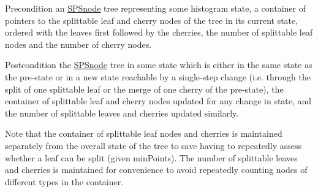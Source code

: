 \begin{DoxyPrecond}{\-Precondition}
an \hyperlink{classsubpavings_1_1SPSnode}{\-S\-P\-Snode} tree representing some histogram state, a container of pointers to the splittable leaf and cherry nodes of the tree in its current state, ordered with the leaves first followed by the cherries, the number of splittable leaf nodes and the number of cherry nodes. 
\end{DoxyPrecond}
\begin{DoxyPostcond}{\-Postcondition}
the \hyperlink{classsubpavings_1_1SPSnode}{\-S\-P\-Snode} tree in some state which is either in the same state as the pre-\/state or in a new state reachable by a single-\/step change (i.\-e. through the split of one splittable leaf or the merge of one cherry of the pre-\/state), the container of splittable leaf and cherry nodes updated for any change in state, and the number of splittable leaves and cherries updated similarly.
\end{DoxyPostcond}
\begin{DoxyNote}{\-Note}
that the container of splittable leaf nodes and cherries is maintained separately from the overall state of the tree to save having to repeatedly assess whether a leaf can be split (given min\-Points). \-The number of splittable leaves and cherries is maintained for convenience to avoid repeatedly counting nodes of different types in the container.
\end{DoxyNote}

